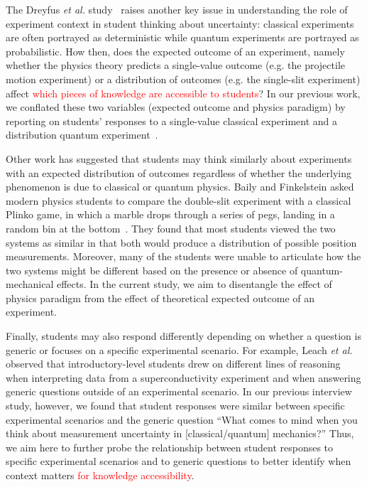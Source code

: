 \documentclass[english,aps,prstper,reprint,showpacs,longbibliography,superscriptaddress,nofootinbib]{revtex4-2}
\begin{document}
The Dreyfus \textit{et al.} study~\cite{Dreyfus2019} raises another key issue in understanding the role of experiment context in student thinking about uncertainty: classical experiments are often portrayed as deterministic while quantum experiments are portrayed as probabilistic. How then, does the expected outcome of an experiment, namely whether the physics theory predicts a single-value outcome (e.g. the projectile motion experiment) or a distribution of outcomes (e.g. the single-slit experiment) affect \textcolor{red}{which pieces of knowledge are accessible to students}? In our previous work, we conflated these two variables (expected outcome and physics paradigm) by reporting on students' responses to a single-value classical experiment and a distribution quantum experiment~\cite{Stein2019, Stump2020}.

Other work has suggested that students may think similarly about experiments with an expected distribution of outcomes regardless of whether the underlying phenomenon is due to classical or quantum physics. Baily and Finkelstein asked modern physics students to compare the double-slit experiment with a classical Plinko game, in which a marble drops through a series of pegs, landing in a random bin at the bottom~\cite{Baily2009a}. They found that most students viewed the two systems as similar in that both would produce a distribution of possible position measurements. Moreover, many of the students were unable to articulate how the two systems might be different based on the presence or absence of quantum-mechanical effects. In the current study, we aim to disentangle the effect of physics paradigm from the effect of theoretical expected outcome of an experiment.

Finally, students may also respond differently depending on whether a question is generic or focuses on a specific experimental scenario. For example, Leach \textit{et al.}~\cite{Leach2000} observed that introductory-level students drew on different lines of reasoning when interpreting data from a superconductivity experiment and when answering generic questions outside of an experimental scenario. In our previous interview study, however, we found that student responses were similar between specific experimental scenarios and the generic question ``What comes to mind when you think about measurement uncertainty in [classical/quantum] mechanics?'' Thus, we aim here to further probe the relationship between student responses to specific experimental scenarios and to generic questions to better identify when context matters \textcolor{red}{for knowledge accessibility}.
\end{document}
